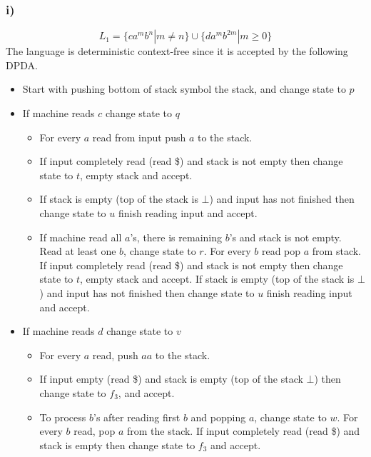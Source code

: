 \documentclass[12pt]{article}
\begin{document}
\subsubsection*{i)}
$$L_1 = \{ca^mb^n | m \neq n\} \cup \{da^mb^{2m} | m \geq 0\}$$
The language is deterministic context-free since it is accepted by the following DPDA.
\begin{itemize}
    \item Start with pushing bottom of stack symbol the stack, and change state to $p$
    \item If machine reads $c$ change state to $q$
    \begin{itemize}
        \item For every $a$ read from input push $a$ to the stack. 
        \item If input completely read (read \$) and stack is not empty then change state to $t$, empty stack and accept.
        \item If stack is empty (top of the stack is $\bot$) and input has not finished then change state to $u$ finish reading input and accept.
        \item If machine read all $a$'s, there is remaining $b$'s and stack is not empty. Read at least one $b$, change state to $r$. For every $b$ read pop $a$ from stack. If input completely read (read \$) and stack is not empty then change state to $t$, empty stack and accept. If stack is empty (top of the stack is $\bot$) and input has not finished then change state to $u$ finish reading input and accept.
    \end{itemize}
    \item If machine reads $d$ change state to $v$
    \begin{itemize}
        \item For every $a$ read, push $aa$ to the stack.
        \item If input empty (read \$) and stack is empty (top of the stack $\bot$) then change state to $f_3$, and accept.
        \item To process $b$'s after reading first $b$ and popping $a$, change state to $w$. For every $b$ read, pop $a$ from the stack. If input completely read (read \$) and stack is empty then change state to $f_3$ and accept.
    \end{itemize}
\end{itemize}
\end{document}
